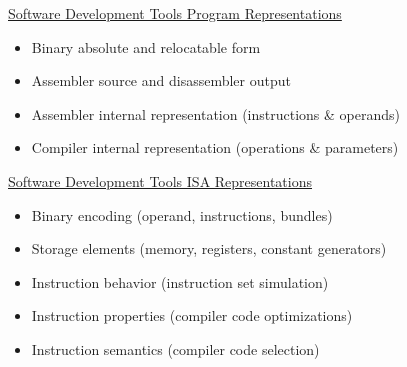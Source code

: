 \documentclass[a4]{seminar}
\begin{document}
\begin{slide}


\begin{center} \underline{Software Development Tools Program Representations}
\end{center}

\begin{itemize}

\item Binary absolute and relocatable form

\item Assembler source and disassembler output

\item Assembler internal representation (instructions \& operands)

\item Compiler internal representation (operations \& parameters)

\end{itemize}

\begin{center} \underline{Software Development Tools ISA Representations}
\end{center}

\begin{itemize}

\item Binary encoding (operand, instructions, bundles)

\item Storage elements (memory, registers, constant generators)

\item Instruction behavior (instruction set simulation)

\item Instruction properties (compiler code optimizations)

\item Instruction semantics (compiler code selection)

\end{itemize}

\end{slide}
\end{document}
